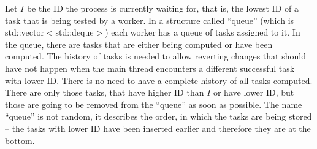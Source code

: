 Let $I$ be the ID the process is currently waiting for, that is, the lowest ID of a task that is being tested by a worker. In a structure called ``queue'' (which is std::vector$<$std::deque$>$) each worker has a queue of tasks assigned to it. In the queue, there are tasks that are either being computed or have been computed. The history of tasks is needed to allow reverting changes that should have not happen when the main thread encounters a different successful task with lower ID. There is no need to have a complete history of all tasks computed. There are only those tasks, that have higher ID than $I$ or have lower ID, but those are going to be removed from the ``queue'' as soon as possible. The name ``queue'' is not random, it describes the order, in which the tasks are being stored -- the tasks with lower ID have been inserted earlier and therefore they are at the bottom.

